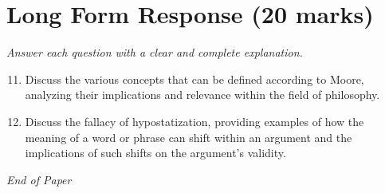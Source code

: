 \documentclass[12pt]{article}
\begin{document}
\section*{Long Form Response (20 marks)}
\textit{Answer each question with a clear and complete explanation.}
\begin{enumerate}[label=\arabic*.]
\setcounter{enumi}{10}
\item Discuss the various concepts that can be defined according to Moore, analyzing their implications and relevance within the field of philosophy.
\item Discuss the fallacy of hypostatization, providing examples of how the meaning of a word or phrase can shift within an argument and the implications of such shifts on the argument's validity.
\end{enumerate}

\vfill
\noindent\textit{End of Paper}
\end{document}
